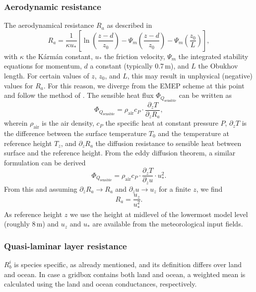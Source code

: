 \documentclass[gmd, manuscript]{copernicus}
\begin{document}
\subsubsection{Aerodynamic resistance}
\label{subsubsec:Ra}
The aerodynamical resistance $R_a$ as described in \citet{Simpson2003,ACP:Simpson2012}
\begin{equation}
  R_a = \frac{1}{\kappa u_*}\left[{\ln{\left(\frac{z-d}{z_0}\right)}-\Psi_m\left(\frac{z-d}{z_0}\right)-\Psi_m\left(\frac{z_0}{L}\right)}\right],
\end{equation}
with $\kappa$ the K\'{a}rm\'{a}n constant, $u_*$ the friction velocity, $\Psi_m$ the integrated stability equations for momentum, $d$ a constant (typically 0.7\,\unit{m}), and $L$ the Obukhov length. For certain values of $z$, $z_0$, and $L$, this may result in unphysical (negative) values for $R_a$. For this reason, we diverge from the EMEP scheme at this point and follow the method of \citet{Monteith1973}.
The sensible heat flux $\Phi_{Q_\text{sensible}}$ can be written as
\begin{equation}
\Phi_{Q_\text{sensible}} = \rho_\text{air} c_P \cdot \frac{\partial_z T}{\partial_z R_a},
\end{equation}
wherein $\rho_\text{air}$ is the air density, $c_P$ the specific heat at constant pressure $P$, $\partial_z T$ is the difference between the surface temperature $T_0$ and the temperature at reference height $T_z$, and $\partial_z R_a$ the diffusion resistance to sensible heat between surface and the reference height. From the eddy diffusion theorem, a similar formulation can be derived
\begin{equation}
  \Phi_{Q_\text{sensible}} = \rho_\text{air} c_P \cdot \frac{\partial_z T}{\partial_z u} \cdot u_*^2.
\end{equation}
From this and assuming $\partial_z R_a \rightarrow R_a $ and $\partial_z u \rightarrow u_z $ for a finite $z$, we find 
\begin{equation}
  R_a = \frac{u_z}{u_*^2}.
\end{equation}
As reference height $z$ we use the height at midlevel of the lowermost model level (roughly 8\,\unit{m}) and $u_z$ and $u_*$ are available from the meteorological input fields.

\subsubsection{Quasi-laminar layer resistance}
\label{subsubsec:Rb}
$R_b^i$ is species specific, as already mentioned, and its definition differs over land and ocean. In case a gridbox contains both land and ocean, a weighted mean is calculated using the land and ocean conductances, respectively.\\
\end{document}
